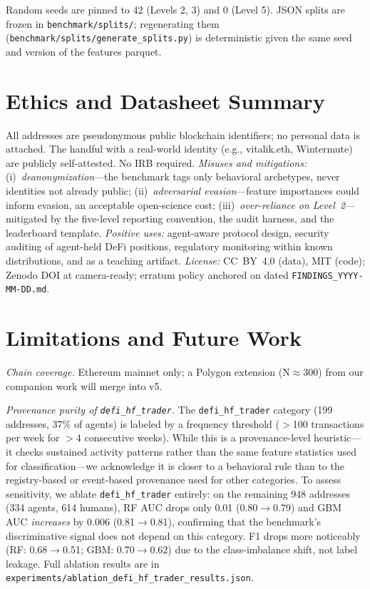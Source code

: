 \documentclass[10pt]{article}
\begin{document}
Random seeds are pinned to 42 (Levels 2, 3) and 0 (Level 5). JSON splits are frozen in \texttt{benchmark/splits/}; regenerating them (\texttt{benchmark/splits/generate\_splits.py}) is deterministic given the same seed and version of the features parquet.

\section{Ethics and Datasheet Summary}
\label{sec:ethics}

All \datasetNAddresses{} addresses are pseudonymous public blockchain identifiers; no personal data is attached. The handful with a real-world identity (e.g., vitalik.eth, Wintermute) are publicly self-attested. No IRB required. \emph{Misuses and mitigations:} (i)~\emph{deanonymization}---the benchmark tags only behavioral archetypes, never identities not already public; (ii)~\emph{adversarial evasion}---feature importances could inform evasion, an acceptable open-science cost; (iii)~\emph{over-reliance on Level~2}---mitigated by the five-level reporting convention, the audit harness, and the leaderboard template. \emph{Positive uses:} agent-aware protocol design, security auditing of agent-held DeFi positions, regulatory monitoring within known distributions, and as a teaching artifact. \emph{License:} CC~BY~4.0 (data), MIT (code); Zenodo DOI at camera-ready; erratum policy anchored on dated \texttt{FINDINGS\_YYYY-MM-DD.md}.

\section{Limitations and Future Work}
\label{sec:limitations}

\emph{Chain coverage.} Ethereum mainnet only; a Polygon extension (N$\approx$300) from our companion work will merge into v5.

\emph{Provenance purity of \texttt{defi\_hf\_trader}.} The \texttt{defi\_hf\_trader} category (199 addresses, 37\% of agents) is labeled by a frequency threshold ($>$100 transactions per week for $>$4 consecutive weeks). While this is a provenance-level heuristic---it checks sustained activity patterns rather than the same feature statistics used for classification---we acknowledge it is closer to a behavioral rule than to the registry-based or event-based provenance used for other categories. To assess sensitivity, we ablate \texttt{defi\_hf\_trader} entirely: on the remaining 948 addresses (334 agents, 614 humans), RF AUC drops only 0.01 (0.80$\to$0.79) and GBM AUC \emph{increases} by 0.006 (0.81$\to$0.81), confirming that the benchmark's discriminative signal does not depend on this category. F1 drops more noticeably (RF: 0.68$\to$0.51; GBM: 0.70$\to$0.62) due to the class-imbalance shift, not label leakage. Full ablation results are in \texttt{experiments/ablation\_defi\_hf\_trader\_results.json}.
\end{document}
